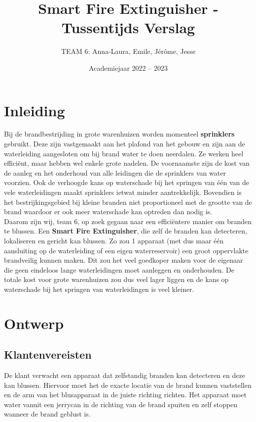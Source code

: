\documentclass[kulak]{kulakarticle} %
\title{Smart Fire Extinguisher - Tussentijds Verslag}
\author{TEAM 6: Anna-Laura, Emile, Jérôme, Jesse}
\date{Academiejaar 2022 -- 2023}
\begin{document}
\maketitle

\tableofcontents

\section*{Inleiding}
                                          
	Bij de brandbestrijding in grote warenhuizen worden momenteel \textbf{sprinklers} gebruikt. Deze zijn vastgemaakt aan het plafond van het gebouw en zijn aan de waterleiding aangesloten om bij brand water te doen neerdalen. Ze werken heel efficiënt, maar hebben wel enkele grote nadelen. De voornaamste zijn de kost van de aanleg en het onderhoud van alle leidingen die de sprinklers van water voorzien. Ook de verhoogde kans op waterschade bij het springen van één van de vele waterleidingen maakt sprinklers ietwat minder aantrekkelijk. Bovendien is het bestrijkingsgebied bij kleine branden niet proportioneel met de grootte van de brand waardoor er ook meer waterschade kan optreden dan nodig is. \\

	Daarom zijn wij, team 6,  op zoek gegaan naar een efficiëntere manier om branden te blussen. Een \textbf{Smart Fire Extinguisher}, die zelf de branden kan detecteren, lokaliseren en gericht kan blussen. Zo zou 1 apparaat (met dus maar één aansluiting op de waterleiding of een eigen waterreservoir) een groot oppervlakte brandveilig kunnen maken. Dit zou het veel goedkoper maken voor de eigenaar die geen eindeloos lange waterleidingen moet aanleggen en onderhouden. De totale kost voor grote warenhuizen zou dus veel lager liggen en de kans op waterschade bij het springen van waterleidingen is veel kleiner.



\section{Ontwerp}


	\subsection{Klantenvereisten}

		De klant verwacht een apparaat dat zelfstandig branden kan detecteren en deze kan blussen. Hiervoor moet het de exacte locatie van de brand kunnen vaststellen en de arm van het blusapparaat in de juiste richting richten. Het apparaat moet water vanuit een jerrycan in de richting van de brand spuiten en zelf stoppen wanneer de brand geblust is. 
		
\end{document}
